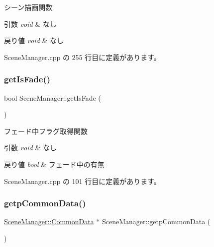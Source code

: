 シーン描画関数 


\begin{DoxyParams}{引数}
{\em void} & なし \\
\hline
\end{DoxyParams}

\begin{DoxyRetVals}{戻り値}
{\em void} & なし \\
\hline
\end{DoxyRetVals}


 Scene\+Manager.\+cpp の 255 行目に定義があります。

\mbox{\label{class_scene_manager_a92336770a77daef88d99f14352a53c60}} 
\subsubsection{\texorpdfstring{get\+Is\+Fade()}{getIsFade()}}
{\footnotesize\ttfamily bool Scene\+Manager\+::get\+Is\+Fade (\begin{DoxyParamCaption}{ }\end{DoxyParamCaption})}



フェード中フラグ取得関数 


\begin{DoxyParams}{引数}
{\em void} & なし \\
\hline
\end{DoxyParams}

\begin{DoxyRetVals}{戻り値}
{\em bool} & フェード中の有無 \\
\hline
\end{DoxyRetVals}


 Scene\+Manager.\+cpp の 101 行目に定義があります。

\mbox{\label{class_scene_manager_a4de42577d81672dee3e79300e745553c}} 
\subsubsection{\texorpdfstring{getp\+Common\+Data()}{getpCommonData()}}
{\footnotesize\ttfamily \mbox{\hyperlink{class_scene_manager_1_1_common_data}{Scene\+Manager\+::\+Common\+Data}} $\ast$ Scene\+Manager\+::getp\+Common\+Data (\begin{DoxyParamCaption}{ }\end{DoxyParamCaption})}




